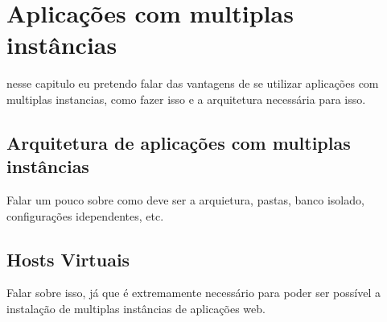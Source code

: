 \chapter{Aplicações com multiplas instâncias}
\label{cap-multiplas}

nesse capitulo eu pretendo falar das vantagens de se utilizar aplicações com
multiplas instancias, como fazer isso e a arquitetura necessária para isso.

\section{Arquitetura de aplicações com multiplas instâncias}

Falar um pouco sobre como deve ser a arquietura, pastas, banco isolado,
configurações idependentes, etc.

\section{Hosts Virtuais}

Falar sobre isso, já que é extremamente necessário para poder ser possível a
instalação de multiplas instâncias de aplicações web.

%
